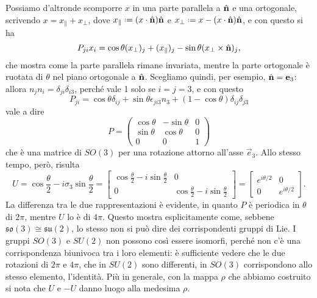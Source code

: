 Possiamo d'altronde scomporre $x$ in una parte parallela a $\hat{\mathbf{n}}$ e una ortogonale, scrivendo $x=x_\parallel+x_\perp$, dove $x_\parallel\defeq(\scalar{x}{\axis})\axis$ e $x_\perp\defeq x-(\scalar{x}{\axis})\axis$, e con questo si ha
\begin{equation}
	P_{ji}x_i=\cos\theta(x_\perp)_j+(x_\parallel)_j-\sin\theta(x_\perp\times\hat{\mathbf{n}})_j,
\end{equation}
che mostra come la parte parallela rimane invariata, mentre la parte ortogonale è ruotata di $\theta$ nel piano ortogonale a $\hat{\mathbf{n}}$.
Scegliamo quindi, per esempio, $\hat{\mathbf{n}}=\mathbf{e}_3$: allora $n_jn_i=\delta_{ji}\delta_{i3}$, perch\'e vale 1 solo se $i=j=3$, e con questo
\begin{equation}
	P_{ji}=\cos\theta\delta_{ij}+\sin\theta\epsilon_{ji3}n_3+(1-\cos\theta)\delta_{ij}\delta_{j3}
\end{equation}
vale a dire
\begin{equation}
	P=
	\begin{pmatrix}
		\cos\theta	&-\sin\theta	&0\\
		\sin\theta	&\cos\theta		&0\\
		0			&0				&1
	\end{pmatrix}
\end{equation}
che è una matrice di $SO(3)$ per una rotazione attorno all'asse $\vec e_3$.
Allo stesso tempo, però, risulta
\begin{equation}
	U=\cos\frac{\theta}2-i\sigma_3\sin\frac{\theta}2=
	\begin{bmatrix}
		\cos\frac{\theta}2-i\sin\frac{\theta}2&0\\
		0&\cos\frac{\theta}2-i\sin\frac{\theta}2
	\end{bmatrix}
	=
	\begin{bmatrix}
		e^{i\theta/2}&0\\
		0&e^{i\theta/2}
	\end{bmatrix}.
\end{equation}
La differenza tra le due rappresentazioni è evidente, in quanto $P$ è periodica in $\theta$ di $2\pi$, mentre $U$ lo è di $4\pi$.
Questo mostra esplicitamente come, sebbene $\mathfrak{so}(3)\cong\mathfrak{su}(2)$, lo stesso non si può dire dei corrispondenti gruppi di Lie.
I gruppi $SO(3)$ e $SU(2)$ non possono cos\`i essere isomorfi, perch\'e non c'è una corrispondenza biunivoca tra i loro elementi: è sufficiente vedere che le due rotazioni di $2\pi$ e $4\pi$, che in $SU(2)$ sono differenti, in $SO(3)$ corrispondono allo stesso elemento, l'identità.
Più in generale, con la mappa $\rho$ che abbiamo costruito si nota che $U$ e $-U$ danno luogo alla medesima $\rho$.

